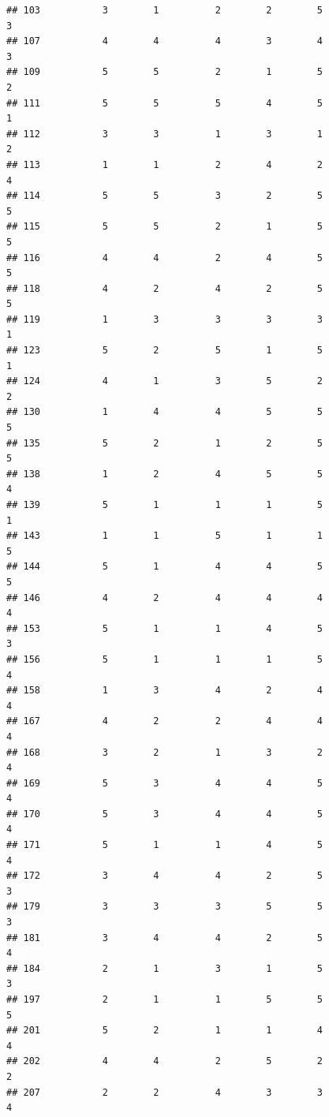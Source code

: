 \documentclass[
]{article}
\begin{document}
\begin{verbatim}
## 103           3        1          2        2        5               3
## 107           4        4          4        3        4               3
## 109           5        5          2        1        5               2
## 111           5        5          5        4        5               1
## 112           3        3          1        3        1               2
## 113           1        1          2        4        2               4
## 114           5        5          3        2        5               5
## 115           5        5          2        1        5               5
## 116           4        4          2        4        5               5
## 118           4        2          4        2        5               5
## 119           1        3          3        3        3               1
## 123           5        2          5        1        5               1
## 124           4        1          3        5        2               2
## 130           1        4          4        5        5               5
## 135           5        2          1        2        5               5
## 138           1        2          4        5        5               4
## 139           5        1          1        1        5               1
## 143           1        1          5        1        1               5
## 144           5        1          4        4        5               5
## 146           4        2          4        4        4               4
## 153           5        1          1        4        5               3
## 156           5        1          1        1        5               4
## 158           1        3          4        2        4               4
## 167           4        2          2        4        4               4
## 168           3        2          1        3        2               4
## 169           5        3          4        4        5               4
## 170           5        3          4        4        5               4
## 171           5        1          1        4        5               4
## 172           3        4          4        2        5               3
## 179           3        3          3        5        5               3
## 181           3        4          4        2        5               4
## 184           2        1          3        1        5               3
## 197           2        1          1        5        5               5
## 201           5        2          1        1        4               4
## 202           4        4          2        5        2               2
## 207           2        2          4        3        3               4

\end{verbatim}
\end{document}
